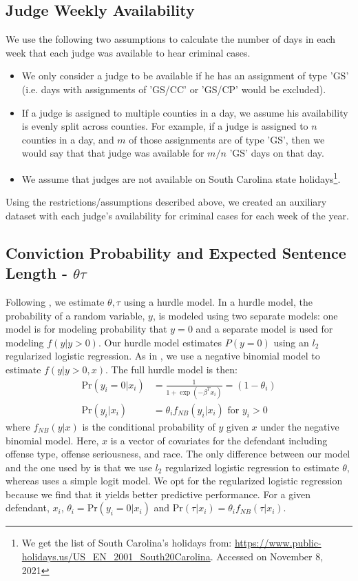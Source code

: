 \documentclass[11pt, oneside]{article}   	%
\theoremstyle{ModifiedStyle}
\begin{document}
  \subsection{Judge Weekly Availability}
	  We use the following two assumptions to calculate the number of days in each week that each judge was available to
		hear criminal cases.
		\begin{itemize}
			\item We only consider a judge to be available if he has an assignment of type 'GS' (i.e. days with assignments of 'GS/CC' or 'GS/CP' would be excluded).
			\item If a judge is assigned to multiple counties in a day, we assume his availability is evenly split across counties. For example, if a judge is assigned to $n$ counties in a day, and $m$ of those assignments are of type 'GS', then we would say that that judge was available for $m/n$ 'GS' days on that day.
			\item We assume that judges are not available on South Carolina state holidays\footnote{We get the list of South Carolina's holidays from: \url{https://www.public-holidays.us/US_EN_2001_South20Carolina}. Accessed on November 8, 2021}.
		\end{itemize}

		Using the restrictions/assumptions described above, we created an auxiliary dataset with each judge's availability for criminal cases for each week of the year.

	\subsection{Conviction Probability and Expected Sentence Length - $\theta \tau$}
	  \label{theta-tau-estimation}

		Following \cite{hester2017conditional}, we estimate $\theta,\tau$ using a hurdle model. In a hurdle model, the probability of a random variable, $y$, is modeled using two separate models: one model is for modeling probability that $y=0$ and a separate model is used for modeling $f(y|y>0)$. Our hurdle model estimates $P(y=0)$ using an $l_2$ regularized logistic regression. As in \cite{hester2017conditional}, we use a negative binomial model to estimate $f(y|y>0,x)$. The full hurdle model is then:
		\begin{align*}
		  \text{Pr}(y_i=0|x_i) &= \frac{1}{1+\exp(-\beta^Tx_i)} = (1-\theta_i)\\
			\text{Pr}(y_i|x_i) &= \theta_i f_{NB}(y_i|x_i) \text{ for } y_i > 0
		\end{align*}
		where $f_{NB}(y|x)$ is the conditional probability of $y$ given $x$ under the negative binomial model. Here, $x$ is a vector of covariates for the defendant including offense type, offense seriousness, and race. The only difference between our model and the one used by \cite{hester2017conditional} is that we use $l_2$ regularized logistic regression to estimate $\theta$, whereas \cite{hester2017conditional} uses a simple logit model. We opt for the regularized logistic regression because we find that it yields better predictive performance. For a given defendant, $x_i$,  $\theta_i =\text{Pr}(y_i=0|x_i)$ and $ \text{Pr}(\tau|x_i) = \theta_i f_{NB}(\tau|x_i)$.
\end{document}
